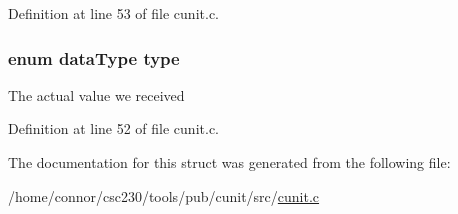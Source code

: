 Definition at line 53 of file cunit.\-c.

\hypertarget{struct_node_a6e3def444d6680408fd3ce31350d852c}{
\subsubsection[{type}]{\setlength{\rightskip}{0pt plus 5cm}enum {\bf data\-Type} type}}\label{struct_node_a6e3def444d6680408fd3ce31350d852c}
The actual value we received 

Definition at line 52 of file cunit.\-c.



The documentation for this struct was generated from the following file\-:\begin{DoxyCompactItemize}
\item 
/home/connor/csc230/tools/pub/cunit/src/\hyperlink{cunit_8c}{cunit.\-c}\end{DoxyCompactItemize}
